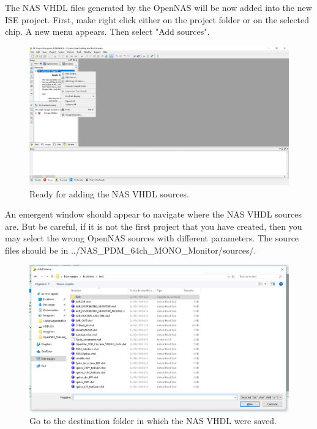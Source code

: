 The NAS VHDL files generated by the OpenNAS will be now added into the new ISE project. First, make right click either on the project folder or on the selected chip. A new menu appears. Then select "Add sources".

\begin{figure}[H]
\centering
\includegraphics[width=1\textwidth]{images/Img34_AddSource.PNG}
\caption{\label{fig:ISE_add_sources}Ready for adding the NAS VHDL sources.}
\end{figure}

An emergent window should appear to navigate where the NAS VHDL sources are. But be careful, if it is not the first project that you have created, then you may select the wrong OpenNAS sources with different parameters. The source files should be in ../NAS\_PDM\_64ch\_MONO\_Monitor/sources/.

\begin{figure}[H]
\centering
\includegraphics[width=1\textwidth]{images/Img35_SelectFiles.PNG}
\caption{\label{fig:ISE_look_for_sources}Go to the destination folder in which the NAS VHDL were saved.}
\end{figure}

